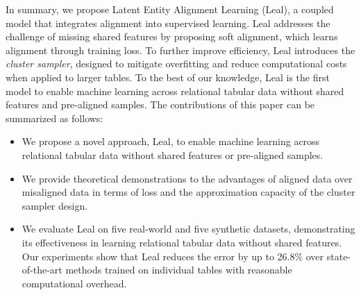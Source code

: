 In summary, we propose Latent Entity Alignment Learning (Leal), a coupled model that integrates alignment into supervised learning. Leal addresses the challenge of missing shared features by proposing soft alignment, which learns alignment through training loss. To further improve efficiency, Leal introduces the \textit{cluster sampler}, designed to mitigate overfitting and reduce computational costs when applied to larger tables. To the best of our knowledge, Leal is the first model to enable machine learning across relational tabular data without shared features and pre-aligned samples. The contributions of this paper can be summarized as follows:

\begin{itemize}
    \item We propose a novel approach, Leal, to enable machine learning across relational tabular data without shared features or pre-aligned samples.
    \item We provide theoretical demonstrations to the advantages of aligned data over misaligned data in terms of loss and the approximation capacity of the cluster sampler design.
    \item We evaluate Leal on five real-world and five synthetic datasets, demonstrating its effectiveness in learning relational tabular data without shared features. Our experiments show that Leal reduces the error by up to 26.8\% over state-of-the-art methods trained on individual tables with reasonable computational overhead.
\end{itemize}
